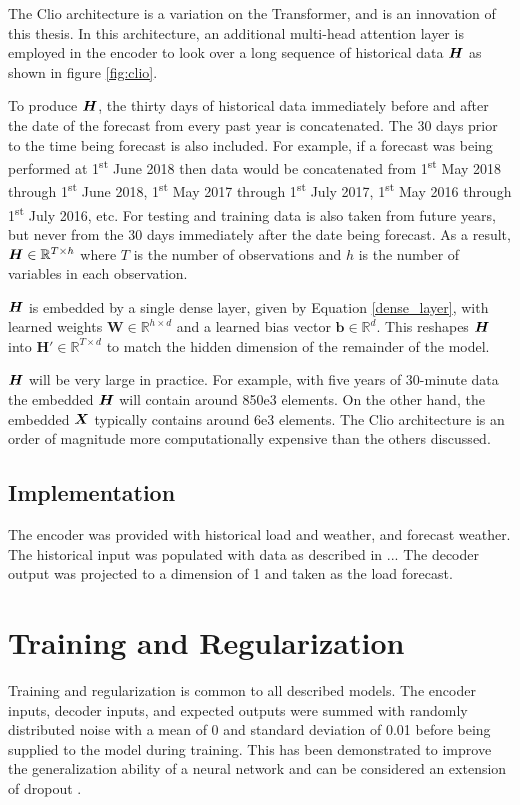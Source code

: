 The Clio architecture is a variation on the Transformer, and is an innovation of this thesis.
In this architecture, an additional multi-head attention layer is employed in the encoder to look over a long sequence of historical data ${\bm{H}}$ as shown in figure \ref{fig:clio}.

To produce ${\bm{H}}$, the thirty days of historical data immediately before and after the date of the forecast from every past year is concatenated.
The 30 days prior to the time being forecast is also included.
For example, if a forecast was being performed at 1\textsuperscript{st} June 2018 then data would be concatenated from 1\textsuperscript{st} May 2018 through 1\textsuperscript{st} June 2018, 1\textsuperscript{st} May 2017 through 1\textsuperscript{st} July 2017, 1\textsuperscript{st} May 2016 through 1\textsuperscript{st} July 2016, etc.
For testing and training data is also taken from future years, but never from the 30 days immediately after the date being forecast.
As a result, ${\bm{H}} \in \mathbb{R}^{T \times h}$ where $T$ is the number of observations and $h$ is the number of variables in each observation.

${\bm{H}}$ is embedded by a single dense layer, given by Equation \ref{dense_layer}, with learned weights $\boldsymbol{W} \in \mathbb{R}^{h \times d}$ and a learned bias vector $\boldsymbol{b} \in \mathbb{R}^{d}$.
This reshapes ${\bm{H}}$ into $\boldsymbol{H'} \in \mathbb{R}^{T \times d}$ to match the hidden dimension of the remainder of the model.

${\bm{H}}$ will be very large in practice.
For example, with five years of 30-minute data the embedded ${\bm{H}}$ will contain around 850e3 elements.
On the other hand, the embedded ${\bm{X}}$ typically contains around 6e3 elements.
The Clio architecture is an order of magnitude more computationally expensive than the others discussed.

\subsection{Implementation}
The encoder was provided with historical load and weather, and forecast weather.
The historical input was populated with data as described in ...
The decoder output was projected to a dimension of 1 and taken as the load forecast.

\section{Training and Regularization}
Training and regularization is common to all described models.
The encoder inputs, decoder inputs, and expected outputs were summed with randomly distributed noise with a mean of 0 and standard deviation of 0.01 before being supplied to the model during training.
This has been demonstrated to improve the generalization ability of a neural network \cite{Wang1999} \cite{Brown2003} and can be considered an extension of dropout \cite{srivastava14a}.

